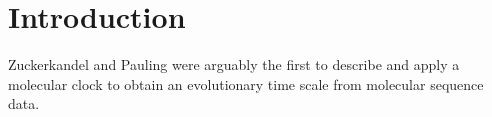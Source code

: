 \section{Introduction} 
Zuckerkandel and Pauling \cite{ZuckerkandelPauling1967} were arguably the first to describe and apply a molecular clock to obtain an evolutionary time scale from molecular sequence data.
  